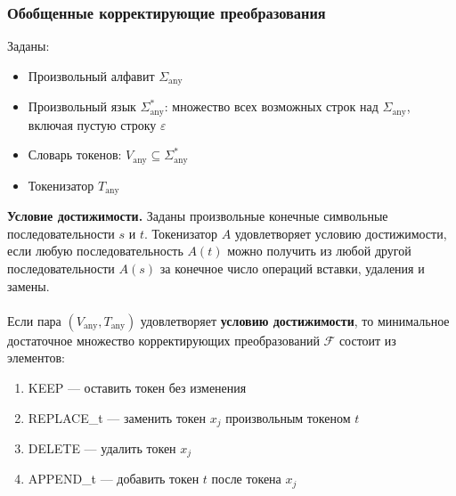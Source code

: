 \documentclass[10pt]{beamer}
\begin{document}
\begin{frame}
\frametitle{Обобщенные корректирующие преобразования}

\justifying
\begin{small}
Заданы: 
\begin{itemize}
\item Произвольный алфавит \( \Sigma_{\text{any}} \) 
\item Произвольный язык \( \Sigma_{\text{any}}^* \): множество всех возможных строк над \(\Sigma_{\text{any}} \), включая пустую строку \(\varepsilon\) 
\item Словарь токенов: \( V_{\text{any}} \subseteq \Sigma_{\text{any}}^* \)
\item Токенизатор $T_{\text{any}}$
\end{itemize}
\textbf{Условие достижимости.} Заданы произвольные конечные символьные последовательности $s$ и $t$. Токенизатор $ A $ удовлетворяет условию достижимости, если любую последовательность  $ A(t) $ можно получить из любой другой последовательности $ A(s) $ за конечное число операций вставки, удаления и замены. \\
~\\

Если пара \((V_{\text{any}}, T_{\text{any}})\) удовлетворяет \textbf{условию достижимости}, то минимальное достаточное множество корректирующих преобразований $\mathcal{F}$ состоит из элементов:  

\begin{enumerate}
\item KEEP --- оставить токен без изменения
\item REPLACE\_t --- заменить токен $x_{j}$ произвольным токеном $t$
\item DELETE --- удалить токен $x_{j}$
\item APPEND\_t --- добавить токен $t$ после токена $x_{j}$
\end{enumerate}


\end{small}

\end{frame}
\end{document}
